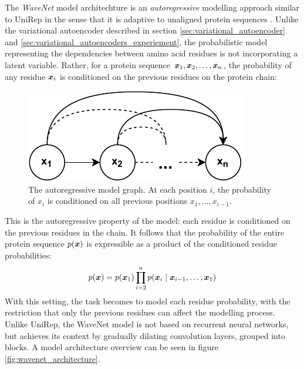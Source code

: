 The \textit{WaveNet} model architechture is an \textit{autoregressive} modelling approach similar to UniRep in the sense that it is adaptive to unaligned protein sequences \cite{AlQuraishiUnsupervised, oord2016wavenet}. Unlike the variational autoencoder described in section \ref{sec:variational_autoencoder} and \ref{sec:variational_autoencoders_experiement}, the probabilistic model representing the dependencies between amino acid residues is not incorporating a latent variable. Rather, for a protein sequence $\bm{ x }_1, \bm{ x }_2, \ldots, \bm{ x }_n$, the probability of any residue $\bm{ x }_i$ is conditioned on the previous residues on the protein chain:
\begin{figure}[H]
    \centering
    \includegraphics{report/figures/autoregressive.pdf}
    \caption{The autoregressive model graph. At each position $i$, the probability of $x_i$ is conditioned on all previous positions $x_1, \ldots, x_{i - 1}$.}
    \label{fig:autoregressive}
\end{figure}
This is the autoregressive property of the model: each residue is conditioned on the previous residues in the chain. It follows that the probability of the entire protein sequence $p(\bm{ x })$ is expressible as a product of the conditioned residue probabilities:
\[ p(\bm{ x }) = p(\bm{ x }_1) \prod_{i = 2}^n p(\bm{ x }_i \mid \bm{ x }_{i - 1}, \ldots, \bm{ x }_1)
\]
With this setting, the task becomes to model each residue probability, with the restriction that only the previous residues can affect the modelling process. Unlike UniRep, the WaveNet model is not based on recurrent neural networks, but achieves its context by gradually dilating convolution layers, grouped into blocks. A model architecture overview can be seen in figure \ref{fig:wavenet_architecture}.

